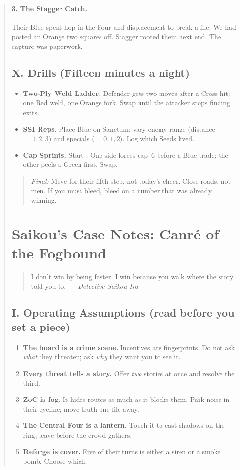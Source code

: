 \documentclass[11pt]{article}
\newcommand{\CapC}[1]{\textcolor{green!40!black}{\scriptsize\ttfamily[G:#1]}}
\begin{document}
\begin{quote}
\paragraph{3. The Stagger Catch.} Their Blue spent hop in the Four and displacement to break a file. We had posted an Orange two squares off. Stagger rooted them next end. The capture was paperwork.

\subsection{X. Drills (Fifteen minutes a night)}
\begin{itemize}\itemsep0.2em
  \item \textbf{Two-Ply Weld Ladder.} Defender gets two moves after a Cross hit: one Red weld, one Orange fork. Swap until the attacker stops finding exits.
  \item \textbf{SSI Reps.} Place Blue on Sanctum; vary enemy range (distance $=1,2,3$) and specials ($=0,1,2$). Log which Seeds lived.
  \item \textbf{Cap Sprints.} Start \CapC{3--2}. One side forces cap~6 before a Blue trade; the other peels a Green first. Swap.
\end{itemize}

\begin{quote}\small
\emph{Final:} Move for their fifth step, not today’s cheer. Close roads, not men. If you must bleed, bleed on a number that was already winning.
\end{quote}


\section{Saikou’s Case Notes: Canré of the Fogbound}
\label{sec:saikou-manual}

\begin{quote}\small
I don’t win by being faster. I win because you walk where the story told you to. \textit{— Detective Saikou Ira}
\end{quote}

\subsection{I. Operating Assumptions (read before you set a piece)}
\begin{enumerate}\itemsep0.25em
  \item \textbf{The board is a crime scene.} Incentives are fingerprints. Do not ask \emph{what} they threaten; ask \emph{why} they want you to see it.
  \item \textbf{Every threat tells a story.} Offer \emph{two} stories at once and resolve the third.
  \item \textbf{ZoC is fog.} It hides routes as much as it blocks them. Park noise in their eyeline; move truth one file away.
  \item \textbf{The Central Four is a lantern.} Touch it to cast shadows on the ring; leave before the crowd gathers.
  \item \textbf{Reforge is cover.} Five of their turns is either a siren or a smoke bomb. Choose which.
\end{enumerate}


\end{quote}
\end{document}
